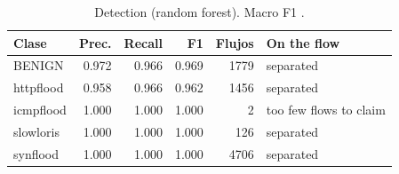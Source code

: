 \begin{table}[t]
\centering
\small
\caption{Detection (random forest). Macro F1 \Fmacro.}
\label{tbl:deteccion}
\begin{tabular}{lrrrrl}
\hline
Clase & Prec. & Recall & F1 & Flujos & On the flow \\
\hline
BENIGN & 0.972 & 0.966 & 0.969 & 1779 & separated \\
httpflood & 0.958 & 0.966 & 0.962 & 1456 & separated \\
icmpflood & 1.000 & 1.000 & 1.000 & 2 & too few flows to claim \\
slowloris & 1.000 & 1.000 & 1.000 & 126 & separated \\
synflood & 1.000 & 1.000 & 1.000 & 4706 & separated \\
\hline
\end{tabular}
\end{table}

